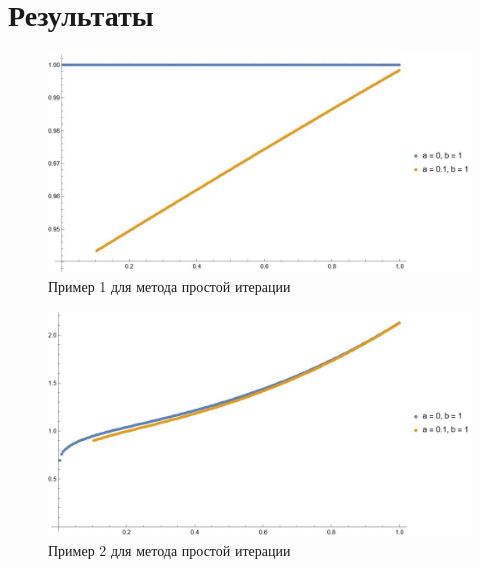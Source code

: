 \documentclass{article}
\begin{document}
	\section{Результаты}

	\begin{figure}[H]
        \centering
        \includegraphics[width=\textwidth]{test1_SIM.jpg}
        \caption{Пример 1 для метода простой итерации}
    \end{figure}
		\begin{figure}[H]
        \centering
        \includegraphics[width=\textwidth]{test2_SIM.jpg}
        \caption{Пример 2 для метода простой итерации}
    \end{figure}
\end{document}
